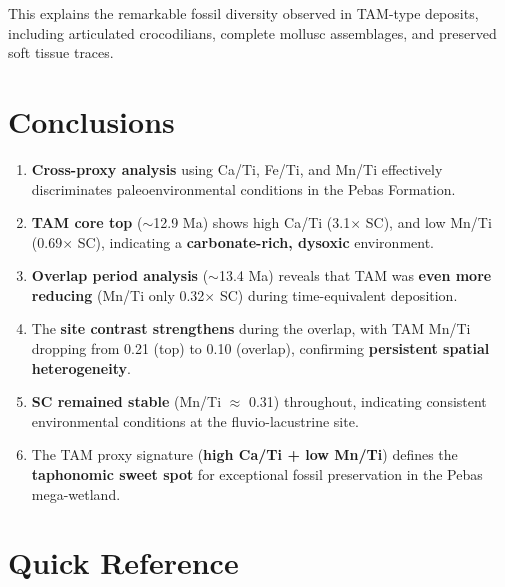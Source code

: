 \documentclass[11pt,a4paper]{article}
\begin{document}
This explains the remarkable fossil diversity observed in TAM-type deposits, including articulated crocodilians, complete mollusc assemblages, and preserved soft tissue traces.

\section{Conclusions}

\begin{enumerate}
    \item \textbf{Cross-proxy analysis} using Ca/Ti, Fe/Ti, and Mn/Ti effectively discriminates paleoenvironmental conditions in the Pebas Formation.

    \item \textbf{TAM core top} ($\sim$12.9 Ma) shows high Ca/Ti (3.1$\times$ SC), and low Mn/Ti (0.69$\times$ SC), indicating a \textbf{carbonate-rich, dysoxic} environment.

    \item \textbf{Overlap period analysis} ($\sim$13.4 Ma) reveals that TAM was \textbf{even more reducing} (Mn/Ti only 0.32$\times$ SC) during time-equivalent deposition.

    \item The \textbf{site contrast strengthens} during the overlap, with TAM Mn/Ti dropping from 0.21 (top) to 0.10 (overlap), confirming \textbf{persistent spatial heterogeneity}.

    \item \textbf{SC remained stable} (Mn/Ti $\approx$ 0.31) throughout, indicating consistent environmental conditions at the fluvio-lacustrine site.

    \item The TAM proxy signature (\textbf{high Ca/Ti + low Mn/Ti}) defines the \textbf{taphonomic sweet spot} for exceptional fossil preservation in the Pebas mega-wetland.
\end{enumerate}

\section{Quick Reference}
\end{document}
